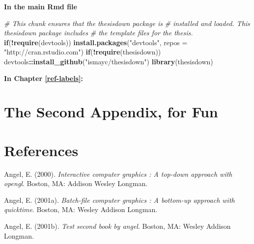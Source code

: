\documentclass[12pt,twoside]{reedthesis}
\newenvironment{Shaded}{\begin{snugshade}}{\end{snugshade}}
\newcommand{\CommentTok}[1]{\textcolor[rgb]{0.56,0.35,0.01}{\textit{#1}}}
\newcommand{\ControlFlowTok}[1]{\textcolor[rgb]{0.13,0.29,0.53}{\textbf{#1}}}
\newcommand{\DataTypeTok}[1]{\textcolor[rgb]{0.13,0.29,0.53}{#1}}
\newcommand{\KeywordTok}[1]{\textcolor[rgb]{0.13,0.29,0.53}{\textbf{#1}}}
\newcommand{\NormalTok}[1]{#1}
\newcommand{\OperatorTok}[1]{\textcolor[rgb]{0.81,0.36,0.00}{\textbf{#1}}}
\newcommand{\StringTok}[1]{\textcolor[rgb]{0.31,0.60,0.02}{#1}}
\theoremstyle{definition}
\theoremstyle{definition}
\theoremstyle{definition}
\theoremstyle{remark}
\begin{document}
\textbf{In the main Rmd file}
\begin{Shaded}
\begin{Highlighting}[]
\CommentTok{# This chunk ensures that the thesisdown package is}
\CommentTok{# installed and loaded. This thesisdown package includes}
\CommentTok{# the template files for the thesis.}
\ControlFlowTok{if}\NormalTok{(}\OperatorTok{!}\KeywordTok{require}\NormalTok{(devtools))}
  \KeywordTok{install.packages}\NormalTok{(}\StringTok{"devtools"}\NormalTok{, }\DataTypeTok{repos =} \StringTok{"http://cran.rstudio.com"}\NormalTok{)}
\ControlFlowTok{if}\NormalTok{(}\OperatorTok{!}\KeywordTok{require}\NormalTok{(thesisdown))}
\NormalTok{  devtools}\OperatorTok{::}\KeywordTok{install_github}\NormalTok{(}\StringTok{"ismayc/thesisdown"}\NormalTok{)}
\KeywordTok{library}\NormalTok{(thesisdown)}
\end{Highlighting}
\end{Shaded}
\textbf{In Chapter \ref{ref-labels}:}

\hypertarget{the-second-appendix-for-fun}{%
\chapter{The Second Appendix, for
Fun}\label{the-second-appendix-for-fun}}

\backmatter

\hypertarget{references}{%
\chapter*{References}\label{references}}


\noindent

\setlength{\parindent}{-0.20in}
\setlength{\leftskip}{0.20in}
\setlength{\parskip}{8pt}

\hypertarget{refs}{}
\leavevmode\hypertarget{ref-angel2000}{}%
Angel, E. (2000). \emph{Interactive computer graphics : A top-down
approach with opengl}. Boston, MA: Addison Wesley Longman.

\leavevmode\hypertarget{ref-angel2001}{}%
Angel, E. (2001a). \emph{Batch-file computer graphics : A bottom-up
approach with quicktime}. Boston, MA: Wesley Addison Longman.

\leavevmode\hypertarget{ref-angel2002a}{}%
Angel, E. (2001b). \emph{Test second book by angel}. Boston, MA: Wesley
Addison Longman.


\end{document}
